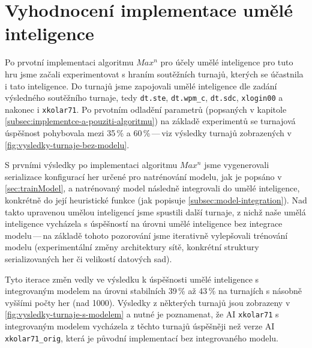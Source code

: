 \documentclass[11pt, a4paper]{article}
\theoremstyle{definition}
\begin{document}
\section{Vyhodnocení implementace umělé inteligence}
\label{sec:eval}

Po prvotní implementaci algoritmu $ Max^n $ pro účely umělé inteligence pro tuto hru jsme začali experimentovat s hraním soutěžních turnajů, kterých se účastnila i tato inteligence. Do turnajů jsme zapojovali umělé inteligence dle zadání výsledného soutěžního turnaje, tedy \texttt{dt.ste},  \texttt{dt.wpm\_c}, \texttt{dt.sdc}, \texttt{xlogin00} a nakonec i \texttt{xkolar71}. Po prvotním odladění parametrů (popsaných v kapitole \ref{subsec:implementce-a-pouziti-algoritmu}) na základě experimentů
se turnajová úspěšnost pohybovala mezi 35\,\% a 60\,\%\,---\,viz výsledky turnajů zobrazených v \ref{fig:vysledky-turnaje-bez-modelu}.

S prvními výsledky po implementaci algoritmu $ Max^n $ jsme vygenerovali serializace konfigurací her určené pro natrénování modelu, jak je popsáno v \ref{sec:trainModel}, a natrénovaný model následně integrovali do umělé inteligence, konkrétně do její heuristické funkce (jak popisuje \ref{subsec:model-integration}). Nad takto upravenou umělou inteligencí jsme spustili další turnaje, z nichž naše umělá inteligence vycházela s úspěšností na úrovni umělé inteligence bez integrace modelu\,---\,na základě tohoto pozorování jsme iterativně vylepšovali trénování modelu (experimentální změny architektury sítě, konkrétní struktury serializovaných her či velikostí datových sad). 

Tyto iterace změn vedly ve výsledku k úspěšnosti umělé inteligence s integrovaným modelem na úrovni stabilních 39\,\% až 43\,\% na turnajích s násobně vyššími počty her (nad 1000). Výsledky z některých turnajů jsou zobrazeny v \ref{fig:vysledky-turnaje-s-modelem} a nutné je poznamenat, že AI \texttt{xkolar71} s integrovaným modelem vycházela z těchto turnajů úspěšněji než verze AI \texttt{xkolar71\_orig}, která je původní implementací bez integrovaného modelu.
\end{document}
